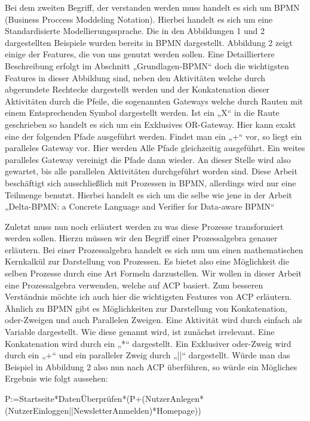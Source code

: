 Bei dem zweiten Begriff, der verstanden werden muss handelt es sich um BPMN (Business Proccess Moddeling Notation). Hierbei handelt es sich um eine Standardisierte Modellierungssprache. Die in den Abbildungen 1 und 2 dargestellten Beispiele wurden bereits in BPMN dargestellt. Abbildung 2 zeigt einige der Features, die von uns genutzt werden sollen. Eine Detailliertere Beschreibung erfolgt im Abschnitt „Grundlagen-BPMN“ doch die wichtigsten Features in dieser Abbildung sind, neben den Aktivitäten welche durch abgerundete Rechtecke dargestellt werden und der Konkatenation dieser Aktivitäten durch die Pfeile, die sogenannten Gateways welche durch Rauten mit einem Entsprechenden Symbol dargestellt werden. Ist ein „X“ in die Raute geschrieben so handelt es sich um ein Exklusives OR-Gateway. Hier kann exakt eine der folgenden Pfade ausgeführt werden. Findet man ein „+“ vor, so liegt ein paralleles Gateway vor. Hier werden Alle Pfade gleichzeitig ausgeführt. Ein weites paralleles Gateway vereinigt die Pfade dann wieder. An dieser Stelle wird also gewartet, bis alle parallelen Aktivitäten durchgeführt worden sind. Diese Arbeit beschäftigt sich ausschließlich mit Prozessen in BPMN, allerdings wird nur eine Teilmenge benutzt. Hierbei handelt es sich um die selbe wie jene in der Arbeit „Delta-BPMN: a Concrete Language and Verifier for Data-aware BPMN“

Zuletzt muss nun noch erläutert werden zu was diese Prozesse transformiert werden sollen. Hierzu müssen wir den Begriff einer Prozessalgebra genauer erläutern. Bei einer Prozessalgebra handelt es sich nun um einen mathematischen Kernkalkül zur Darstellung von Prozessen. Es bietet also eine Möglichkeit die selben Prozesse durch eine Art Formeln darzustellen. Wir wollen in dieser Arbeit eine Prozessalgebra verwenden, welche auf ACP basiert.  Zum besseren Verständnis möchte ich auch hier die wichtigsten Features von ACP erläutern. Ähnlich zu BPMN gibt es Möglichkeiten zur Darstellung von Konkatenation, oder-Zweigen und auch Parallelen Zweigen. Eine Aktivität wird durch einfach als Variable dargestellt. Wie diese genannt wird, ist zunächst irrelevant. Eine Konkatenation wird durch ein „*“ dargestellt. Ein Exklusiver oder-Zweig wird durch ein „+“ und ein paralleler Zweig durch „||“ dargestellt. Würde man das Beispiel in Abbildung 2 also nun nach ACP überführen, so würde ein Mögliches Ergebnis wie folgt aussehen: 

P:=Startseite*DatenÜberprüfen*(P+(NutzerAnlegen*(NutzerEinloggen||NewsletterAnmelden)*Homepage))

